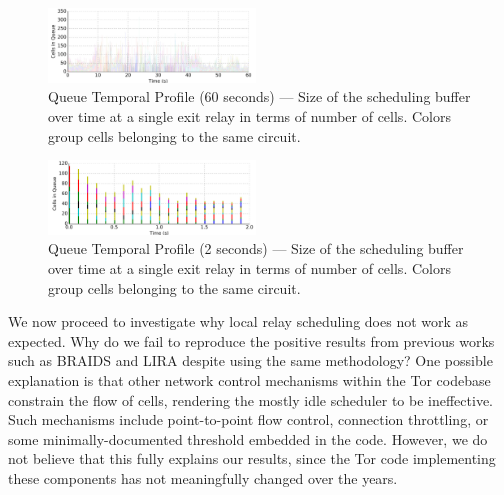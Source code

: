 \begin{figure} \centering
  \includegraphics[width=0.49\textwidth]{images/scheduling_far.pdf}
  \caption[Queue Temporal Profile (60 seconds)]{Queue Temporal Profile (60
    seconds) --- Size of the scheduling buffer over time at a single exit relay
    in terms of number of cells. Colors group cells belonging to the same
    circuit.}
  \label{fig:scheduling_far}
\end{figure}

\begin{figure} \centering
  \includegraphics[width=0.49\textwidth]{images/scheduling_close.pdf}
  \caption[Queue Temporal Profile (2 seconds)]{Queue Temporal Profile (2
    seconds) --- Size of the scheduling buffer over time at a single exit relay
    in terms of number of cells. Colors group cells belonging to the same
    circuit.}
  \label{fig:scheduling_close}
\end{figure}


We now proceed to investigate why local relay scheduling does not work as expected.
Why do we fail to reproduce the positive results from previous works such as BRAIDS and LIRA despite using the same methodology?
One possible explanation is that other network control mechanisms within the Tor codebase constrain the flow of cells, rendering the mostly idle scheduler to be ineffective.
Such mechanisms include point-to-point flow control, connection throttling, or some minimally-documented threshold embedded in the code.
However, we do not believe that this fully explains our results, since the Tor code implementing these components has not meaningfully changed over the years.

